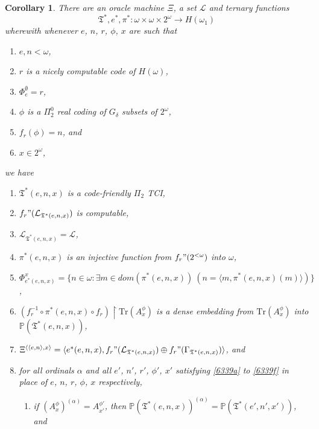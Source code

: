 \documentclass[12pt, twoside]{memoir}
\numberwithin{equation}{section}
\newtheorem{cor}[thm]{Corollary}
\theoremstyle{definition}
\theoremstyle{remark}
\theoremstyle{definition}
\theoremstyle{definition}
\theoremstyle{definition}
\theoremstyle{remark}
\begin{document}
\begin{cor}\label{cor6338}
There are an oracle machine $\Xi$, a set $\mathcal{L}$ and ternary functions
\begin{equation*}
    \mathfrak{T}^*, e^*, \pi^* : \omega \times \omega \times 2^{\omega} \longrightarrow H(\omega_1)
\end{equation*}
wherewith whenever $e$, $n$, $r$, $\phi$, $x$ are such that
\begin{enumerate}[label=(\alph*)]
    \item\label{6339a} $e, n < \omega$,
    \item $r$ is a nicely computable code of $H(\omega)$,
    \item $\Phi^{\emptyset}_e = r$,
    \item $\phi$ is a $\Pi^0_2$ real coding of $G_{\delta}$ subsets of $2^{\omega}$,
    \item $f_r(\phi) = n$, and
    \item\label{6339f} $x \in 2^{\omega}$,
\end{enumerate}
we have
\begin{enumerate}[label=(\arabic*)]
    \item $\mathfrak{T}^*(e, n, x)$ is a code-friendly $\Pi_2$ TCI,
    \item $f_r" (\mathcal{L}_{\mathfrak{T}^*(e, n, x)})$ is computable,
    \item $\mathcal{L}_{\mathfrak{T}^*(e, n, x)} = \mathcal{L}$,
    \item $\pi^*(e, n, x)$ is an injective function from $f_r" (2^{< \omega})$ into $\omega$,
    \item $\Phi^{x}_{e^*(e, n, x)} = \{n \in \omega : \exists m \in dom (\pi^*(e, n, x)) \ (n = \langle m, \pi^*(e, n, x)(m) \rangle)\}$,
    \item $(f_r^{-1} \circ \pi^*(e, n, x) \circ f_r) \restriction \mathrm{Tr}(A^{\phi}_x)$ is a dense embedding from $\mathrm{Tr}(A^{\phi}_x)$ into \\ $\mathbb{P}(\mathfrak{T}^*(e, n, x))$,
    \item $\Xi^{\langle \langle e, n \rangle, x \rangle} = \langle e^*(e, n, x), f_r" (\mathcal{L}_{\mathfrak{T}^*(e, n, x)}) \oplus f_r" (\Gamma_{\mathfrak{T}^*(e, n, x)}) \rangle$, and
    \item for all ordinals $\alpha$ and all $e'$, $n'$, $r'$, $\phi'$, $x'$ satisfying \ref{6339a} to \ref{6339f} in place of $e$, $n$, $r$, $\phi$, $x$ respectively, 
    \begin{enumerate}[label=(\roman*)]
        \item\label{63398i} if $(A^{\phi}_x)^{(\alpha)} = A^{\phi'}_{x'}$, then $\mathbb{P}(\mathfrak{T}^*(e, n, x))^{(\alpha)} = \mathbb{P}(\mathfrak{T}^*(e', n', x'))$, and

\end{enumerate}
\end{enumerate}
\end{cor}
\end{document}
